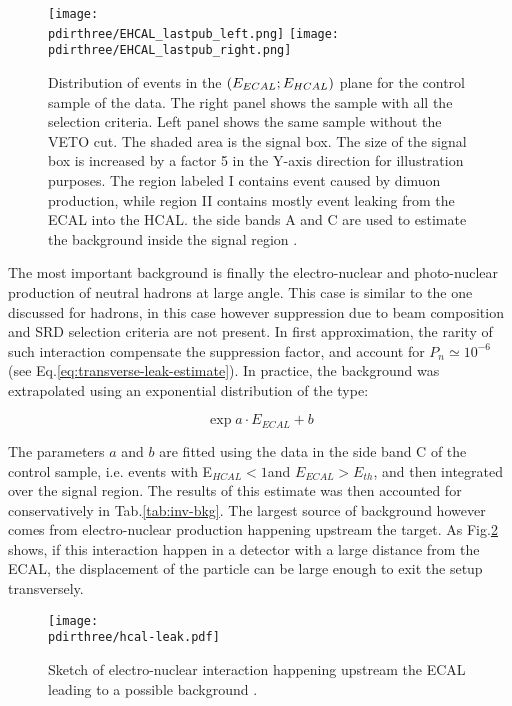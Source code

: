 \begin{figure}[bth!]
  \centering
  \texttt{[image: \\pdirthree/EHCAL\_lastpub\_left.png]}
  \texttt{[image: \\pdirthree/EHCAL\_lastpub\_right.png]}
  \caption[ECAL vs HCAL events band]{Distribution of events in the $(E_{ECAL};E_{HCAL})$ plane for the control sample of the data. The right panel shows the sample with all the selection criteria. Left panel shows the same sample without the VETO cut. The shaded area is the signal box. The size of the signal box is increased by a factor 5 in the Y-axis direction for illustration purposes. The region labeled I contains event caused by dimuon production, while region II contains mostly event leaking from the ECAL into the HCAL. the side bands A and C are used to estimate the background inside the signal region \cite{NA64:2019imj}.}
  \label{fig:ehcal-bkg-bands}
\end{figure}

The most important background is finally the electro-nuclear and photo-nuclear production of neutral hadrons at large angle. This case is similar to the one discussed for hadrons, in this case however suppression due to beam composition and SRD selection criteria are not present. In first approximation, the rarity of such interaction compensate the suppression factor, and account for $P_n \simeq 10^{-6}$ (see Eq.\ref{eq:transverse-leak-estimate}). In practice, the background was extrapolated using an exponential distribution of the type:

\begin{equation}
  \label{eq:bkg-extrapolation}
  \exp{a \cdot E_{ECAL} + b}
\end{equation}

The parameters $a$ and $b$ are fitted using the data in the side band C of the control sample, i.e. events with E$_{HCAL}<1$\gev and $E_{ECAL}>E_{th}$, and then integrated over the signal region. The results of this estimate was then accounted for conservatively in Tab.\ref{tab:inv-bkg}.
The largest source of background however comes from electro-nuclear production happening upstream the target. As Fig.\ref{fig:eh-prod-sketch} shows, if this interaction happen in a detector with a large distance from the ECAL, the displacement of the particle can be large enough to exit the setup transversely. 


\begin{figure}[bth!]
  \centering
  \texttt{[image: \\pdirthree/hcal-leak.pdf]}
  \caption[upstream electro-hadron production upstream]{Sketch of electro-nuclear interaction happening upstream the ECAL leading to a possible background \cite{pdegen-thesis}.}
  \label{fig:eh-prod-sketch}
\end{figure}

